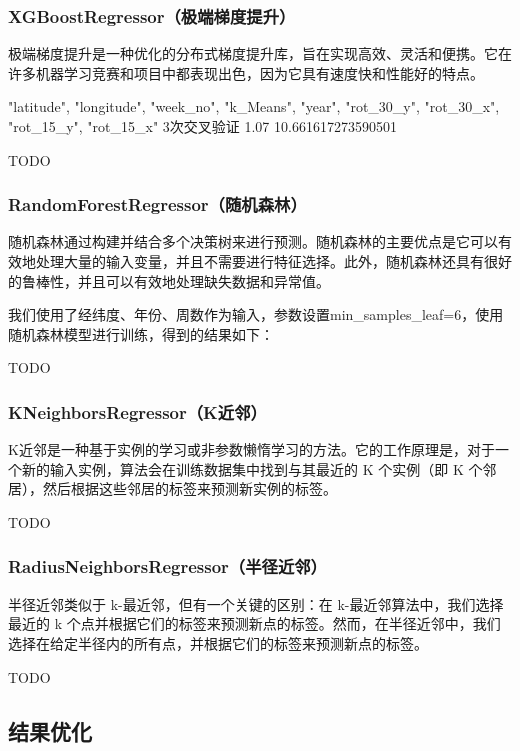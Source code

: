 \documentclass{ctexart}
\begin{document}
\subsubsection{XGBoostRegressor（极端梯度提升）}

极端梯度提升是一种优化的分布式梯度提升库，旨在实现高效、灵活和便携。它在许多机器学习竞赛和项目中都表现出色，因为它具有速度快和性能好的特点。

"latitude", "longitude", "week_no", "k_Means", "year", "rot_30_y", "rot_30_x", "rot_15_y", "rot_15_x"
3次交叉验证
1.07
10.661617273590501

TODO

\subsubsection{RandomForestRegressor（随机森林）}

随机森林通过构建并结合多个决策树来进行预测。随机森林的主要优点是它可以有效地处理大量的输入变量，并且不需要进行特征选择。此外，随机森林还具有很好的鲁棒性，并且可以有效地处理缺失数据和异常值。

我们使用了经纬度、年份、周数作为输入，参数设置min\_samples\_leaf=6，使用随机森林模型进行训练，得到的结果如下：

TODO

\subsubsection{KNeighborsRegressor（K近邻）}

K近邻是一种基于实例的学习或非参数懒惰学习的方法。它的工作原理是，对于一个新的输入实例，算法会在训练数据集中找到与其最近的 K 个实例（即 K 个邻居），然后根据这些邻居的标签来预测新实例的标签。

TODO

\subsubsection{RadiusNeighborsRegressor（半径近邻）}

半径近邻类似于 k-最近邻，但有一个关键的区别：在 k-最近邻算法中，我们选择最近的 k 个点并根据它们的标签来预测新点的标签。然而，在半径近邻中，我们选择在给定半径内的所有点，并根据它们的标签来预测新点的标签。

TODO

\subsection{结果优化}
\end{document}
